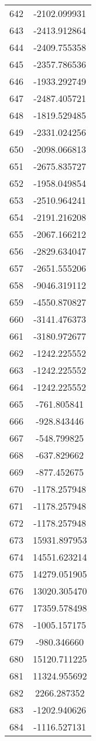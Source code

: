 \documentclass[12pt]{article}
\begin{document}
\begin{longtable}{@{}cc@{}}
642 & -2102.099931 \\
643 & -2413.912864 \\
644 & -2409.755358 \\
645 & -2357.786536 \\
646 & -1933.292749 \\
647 & -2487.405721 \\
648 & -1819.529485 \\
649 & -2331.024256 \\
650 & -2098.066813 \\
651 & -2675.835727 \\
652 & -1958.049854 \\
653 & -2510.964241 \\
654 & -2191.216208 \\
655 & -2067.166212 \\
656 & -2829.634047 \\
657 & -2651.555206 \\
658 & -9046.319112 \\
659 & -4550.870827 \\
660 & -3141.476373 \\
661 & -3180.972677 \\
662 & -1242.225552 \\
663 & -1242.225552 \\
664 & -1242.225552 \\
665 & -761.805841 \\
666 & -928.843446 \\
667 & -548.799825 \\
668 & -637.829662 \\
669 & -877.452675 \\
670 & -1178.257948 \\
671 & -1178.257948 \\
672 & -1178.257948 \\
673 & 15931.897953 \\
674 & 14551.623214 \\
675 & 14279.051905 \\
676 & 13020.305470 \\
677 & 17359.578498 \\
678 & -1005.157175 \\
679 & -980.346660 \\
680 & 15120.711225 \\
681 & 11324.955692 \\
682 & 2266.287352 \\
683 & -1202.940626 \\
684 & -1116.527131 \\

\end{longtable}
\end{document}
